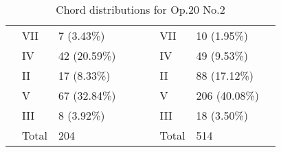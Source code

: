 \begin{table}[tbp]
{\begin{tabular}{|l|l|l|l|l|l|l|l|l|}
 & VII & 7 (3.43\%) &  &  &  & VII & 10 (1.95\%) &  \\ \cline{2-3} \cline{7-8}
 & IV & 42 (20.59\%) &  &  &  & IV & 49 (9.53\%) &  \\ \cline{2-3} \cline{7-8}
 & II & 17 (8.33\%) &  &  &  & II & 88 (17.12\%) &  \\ \cline{2-3} \cline{7-8}
 & V & 67 (32.84\%) &  &  &  & V & 206 (40.08\%) &  \\ \cline{2-3} \cline{7-8}
 & III & 8 (3.92\%) &  &  &  & III & 18 (3.50\%) &  \\ \cline{2-3} \cline{7-8}
 & Total & 204 &  &  &  & Total & 514 &  \\ \cline{1-4} \cline{6-9}
\end{tabular}
}
\caption{Chord distributions for Op.20 No.2}
\label{table:chords_op20n2}
\end{table}

